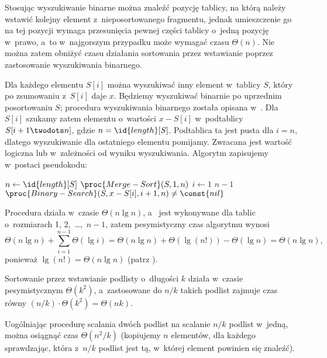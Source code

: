 \exercise %
Stosując wyszukiwanie binarne można znaleźć pozycję tablicy, na którą należy wstawić kolejny element z~nieposortowanego fragmentu, jednak umieszczenie go na tej pozycji wymaga przesunięcia pewnej części tablicy o~jedną pozycję w~prawo, a~to w~najgorszym przypadku może wymagać czasu $\Theta(n)$. Nie można zatem obniżyć czasu działania sortowania przez wstawianie poprzez zastosowanie wyszukiwania binarnego.

\exercise %
Dla każdego elementu $S[i]$ można wyszukiwać inny element w~tablicy $S$, który po zsumowaniu z~$S[i]$ daje $x$. Będziemy wyszukiwać binarnie po uprzednim posortowaniu $S$; procedura wyszukiwania binarnego została opisana w~. Dla $S[i]$ szukamy zatem elementu o~wartości $x-S[i]$ w~podtablicy $S[i+1\twodots n]$, gdzie $n=\id{length}[S]$. Podtablica ta jest pusta dla $i=n$, dlatego wyszukiwanie dla ostatniego elementu pomijamy. Zwracana jest wartość logiczna  lub  w~zależności od wyniku wyszukiwania. Algorytm zapisujemy w~postaci pseudokodu:
\begin{codebox}
\li	$n\gets\id{length}[S]$
\li	$\proc{Merge-Sort}(S,1,n)$
\li	\For $i\gets1$ \To $n-1$
\li		\Do
			\If $\proc{Binary-Search}(S,x-S[i],i+1,n)\ne\const{nil}$
\li				\Then
					\Return{}
				\End
		\End
\li	\Return{}
\end{codebox}

Procedura  działa w~czasie $\Theta(n\lg n)$, a~ jest wykonywane dla tablic o~rozmiarach 1, 2,~\dots,~$n-1$, zatem pesymistyczny czas algorytmu  wynosi
\[
	\Theta(n\lg n)+\sum_{i=1}^{n-1}\Theta(\lg i) = \Theta(n\lg n)+\Theta(\lg(n!))-\Theta(\lg n) = \Theta(n\lg n),
\]
ponieważ $\lg(n!)=\Theta(n\lg n)$ (patrz ).

\problems


\subproblem %
Sortowanie przez wstawianie podlisty o~długości $k$ działa w~czasie pesymistycznym $\Theta(k^2)$, a~zastosowane do $n/k$ takich podlist zajmuje czas równy $(n/k)\cdot\Theta(k^2)=\Theta(nk)$.

\subproblem %
Uogólniając procedurę scalania dwóch podlist na scalanie $n/k$ podlist w~jedną, można osiągnąć czas $\Theta(n^2\!/k)$ (kopiujemy $n$ elementów, dla każdego sprawdzając, która z~$n/k$ podlist jest tą, w~której element powinien się znaleźć).

